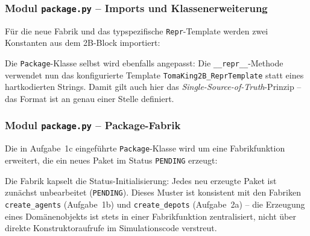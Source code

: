
\subsubsection{Modul \texttt{package.py} – Imports und Klassenerweiterung}

Für die neue Fabrik und das typspezifische \texttt{Repr}-Template werden zwei Konstanten aus dem 2B-Block importiert:



Die \texttt{Package}-Klasse selbst wird ebenfalls angepasst: Die \texttt{\_\_repr\_\_}-Methode verwendet nun das konfigurierte Template \texttt{TomaKing2B\_ReprTemplate} statt eines hartkodierten Strings. Damit gilt auch hier das \textit{Single-Source-of-Truth}-Prinzip -- das Format ist an genau einer Stelle definiert.




\subsubsection{Modul \texttt{package.py} – Package-Fabrik}

Die in Aufgabe~1c eingeführte \texttt{Package}-Klasse wird um eine Fabrikfunktion erweitert, die ein neues Paket im Status \texttt{PENDING} erzeugt: 



Die Fabrik kapselt die Status-Initialisierung: Jedes neu erzeugte Paket ist zunächst unbearbeitet (\texttt{PENDING}). Dieses Muster ist konsistent mit den Fabriken \texttt{create\_agents} (Aufgabe~1b) und \texttt{create\_depots} (Aufgabe~2a) -- die Erzeugung eines Domänenobjekts ist stets in einer Fabrikfunktion zentralisiert, nicht über direkte Konstruktoraufrufe im Simulationscode verstreut.

